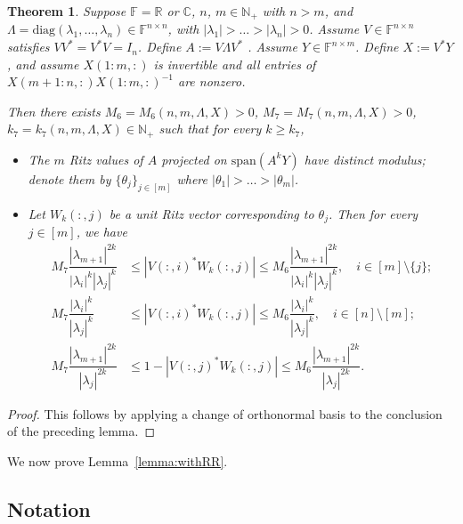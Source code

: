 \documentclass[11pt,a4paper]{article}
\theoremstyle{plain}              %
\newtheorem{theorem}{Theorem}[section]
\theoremstyle{definition}         %
\begin{document}
\begin{theorem}
Suppose \(\mathbb{F}=\mathbb{R}\) or \(\mathbb{C}\), \(n\), \(m\in\mathbb{N}_+\) with \(n>m\), and \(\Lambda=\mathrm{diag}(\lambda_1,\dots,\lambda_n)\in\mathbb{F}^{n\times n}\), with \(|\lambda_1|>\dots>|\lambda_n|>0\). Assume \(V\in\mathbb{F}^{n\times n}\) satisfies \(VV^*=V^*V=I_n\). Define \(A:=V\Lambda V^*\)
. Assume \(Y\in\mathbb{F}^{n\times m}\). Define \(X:=V^*Y\), and assume \(X(1:m,:)\) is invertible and all entries of \(X(m+1:n,:)X(1:m,:)^{-1}\) are nonzero.

Then there exists \(M_6=M_6(n,m,\Lambda,X)>0\), \(M_7=M_7(n,m,\Lambda,X)>0\), \(k_7=k_7(n,m,\Lambda,X)\in\mathbb{N}_+\) such that for every \(k\geq k_7\),

\begin{itemize}
\item The \(m\) Ritz values of \(A\) projected on \(\mathrm{span}(A^kY)\) have distinct modulus; denote them by \(\{\theta_j\}_{j\in[m]}\) where \(|\theta_1|>\dots>|\theta_m|\).
\item Let \(W_k(:,j)\) be a unit Ritz vector corresponding to \(\theta_j\). Then for every \(j\in[m]\), we have
\begin{align*}
M_7\dfrac{|\lambda_{m+1}|^{2k}}{|\lambda_i|^k|\lambda_j|^k}&\leq|V(:,i)^*W_k(:,j)|\leq M_6\dfrac{|\lambda_{m+1}|^{2k}}{|\lambda_i|^k|\lambda_j|^k},\quad i\in[m]\setminus\{j\};\\
M_7\dfrac{|\lambda_i|^k}{|\lambda_j|^k}&\leq|V(:,i)^*W_k(:,j)|\leq M_6\dfrac{|\lambda_i|^k}{|\lambda_j|^k},\quad i\in[n]\setminus[m];\\
M_7\dfrac{|\lambda_{m+1}|^{2k}}{|\lambda_j|^{2k}}&\leq1-|V(:,j)^*W_k(:,j)|\leq M_6\dfrac{|\lambda_{m+1}|^{2k}}{|\lambda_j|^{2k}}.
\end{align*}
\end{itemize}
\end{theorem}
\begin{proof}
This follows by applying a change of orthonormal basis to the conclusion of the preceding lemma.
\end{proof}

We now prove Lemma~\ref{lemma:withRR}.

\subsection{Notation}
\end{document}
